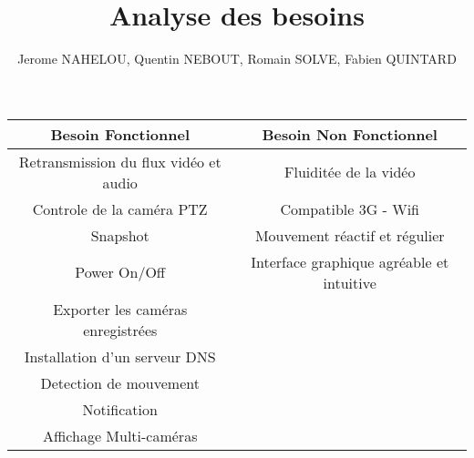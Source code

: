 \documentclass[a4paper,10pt]{report}
\begin{document}
\title{Analyse des besoins}
\author{Jerome NAHELOU, Quentin NEBOUT, Romain SOLVE, Fabien QUINTARD}


 \begin{center}
   \begin{tabular}{|c|c}
    \hline
   Besoin Fonctionnel & Besoin Non Fonctionnel \\
    \hline
    Retransmission du flux vidéo et audio & Fluiditée de la vidéo \\
    Controle de la caméra PTZ & Compatible 3G - Wifi\\
    Snapshot & Mouvement réactif et régulier\\
    Power On/Off & Interface graphique agréable et intuitive\\
    Exporter les caméras enregistrées & \\
    Installation d'un serveur DNS & \\
    Detection de mouvement & \\
    Notification & \\
    Affichage Multi-caméras & \\
    \hline
   \end{tabular}
  \end{center}
  
\end{document}
